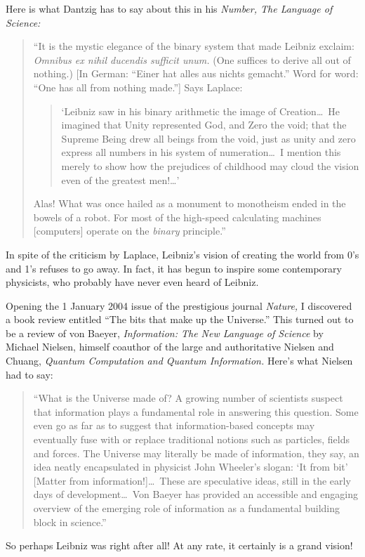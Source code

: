 \documentclass[12pt]{book}
\begin{document}
Here is what Dantzig has to say about this in his \emph{Number, The Language of Science:}
\begin{quotation}
``It is the mystic elegance of the binary system that made Leibniz exclaim:
\emph{Omnibus ex nihil ducendis sufficit unum.} (One suffices to derive all out of nothing.)
[In German: ``Einer hat alles aus nichts gemacht.'' 
Word for word: ``One has all from nothing made.'']
Says Laplace:
\begin{quotation}
`Leibniz saw in his binary arithmetic the image of Creation\ldots\
He imagined that Unity represented God, and Zero the void; that the Supreme Being drew
all beings from the void, just as unity and zero express all numbers in his system
of numeration\ldots\ I mention this merely to show how the prejudices of childhood may cloud the
vision even of the greatest men!\ldots'
\end{quotation}
Alas! What was once hailed as a monument to monotheism
ended in the bowels of a robot. For most of the high-speed calculating machines [computers]
operate on the \emph{binary} principle.''
\end{quotation}
In spite of the criticism by Laplace, Leibniz's vision of creating the world from 0's and 1's
refuses to go away.  
In fact, it has begun to inspire some contemporary physicists,
who probably have never even heard of Leibniz.
 
Opening the 1 January 2004 issue
of the prestigious journal \emph{Nature,}
I discovered a book review entitled ``The bits that make up the Universe.''
This turned out to be a review of von Baeyer, \emph{Information: The New Language of Science}
by Michael Nielsen, himself coauthor of the large and authoritative 
Nielsen and Chuang, \emph{Quantum Computation and Quantum Information.}
Here's what Nielsen had to say:
\begin{quotation}
``What is the Universe made of? A growing number of scientists suspect that information
plays a fundamental role in answering this question. Some even go as far as to suggest
that information-based concepts may eventually fuse with or replace traditional notions
such as particles, fields and forces. The Universe may literally be made of information,
they say, an idea neatly encapsulated in physicist John Wheeler's slogan: `It from bit'
[Matter from information!]\ldots\
These are speculative ideas, still in the early days of development\ldots\
Von Baeyer has provided an accessible and engaging overview of the emerging role of
information as a fundamental building block in science.''
\end{quotation}
So perhaps Leibniz was right after all! At any rate, it certainly is a grand vision!
\end{document}
